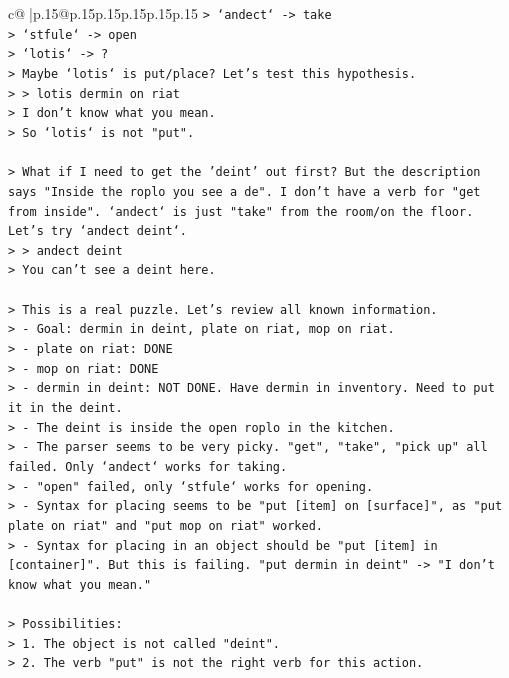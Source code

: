\documentclass{article}
\begin{document}
{\begin{supertabular}{c@{$\;$}|p{.15\linewidth}@{}p{.15\linewidth}p{.15\linewidth}p{.15\linewidth}p{.15\linewidth}p{.15\linewidth}}
{{{\texttt{> `andect` {-}> take} \\
\texttt{> `stfule` {-}> open} \\
\texttt{> `lotis` {-}> ?} \\
\texttt{> Maybe `lotis` is put/place? Let's test this hypothesis.} \\
\texttt{> > lotis dermin on riat} \\
\texttt{> I don't know what you mean.} \\
\texttt{> So `lotis` is not "put".} \\
\\ 
\texttt{> What if I need to get the 'deint' out first? But the description says "Inside the roplo you see a de". I don't have a verb for "get from inside". `andect` is just "take" from the room/on the floor. Let's try `andect deint`.} \\
\texttt{> > andect deint} \\
\texttt{> You can't see a deint here.} \\
\\ 
\texttt{> This is a real puzzle. Let's review all known information.} \\
\texttt{> {-} Goal: dermin in deint, plate on riat, mop on riat.} \\
\texttt{> {-} plate on riat: DONE} \\
\texttt{> {-} mop on riat: DONE} \\
\texttt{> {-} dermin in deint: NOT DONE. Have dermin in inventory. Need to put it in the deint.} \\
\texttt{> {-} The deint is inside the open roplo in the kitchen.} \\
\texttt{> {-} The parser seems to be very picky. "get", "take", "pick up" all failed. Only `andect` works for taking.} \\
\texttt{> {-} "open" failed, only `stfule` works for opening.} \\
\texttt{> {-} Syntax for placing seems to be "put {[}item{]} on {[}surface{]}", as "put plate on riat" and "put mop on riat" worked.} \\
\texttt{> {-} Syntax for placing in an object should be "put {[}item{]} in {[}container{]}". But this is failing. "put dermin in deint" {-}> "I don't know what you mean."} \\
\\ 
\texttt{> Possibilities:} \\
\texttt{> 1. The object is not called "deint".} \\
\texttt{> 2. The verb "put" is not the right verb for this action.} \\
}}}
\end{supertabular}}
\end{document}

